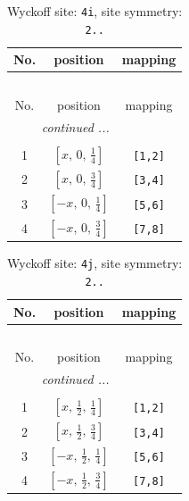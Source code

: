 \documentclass[fleqn,8pt]{jsarticle}
\begin{document}
\begin{longtable}{ccc}
\caption{Wyckoff site: {\tt 4i}, site symmetry: {\tt 2..}}
 \\
 \hline \hline
No. & position & mapping \\ \hline \endfirsthead

\multicolumn{2}{l}{\tablename\ \thetable{}} \\
 \hline \hline
No. & position & mapping \\ \hline \endhead

 \hline \hline
\multicolumn{2}{r}{\footnotesize\it continued ...} \\ \endfoot

 \hline \hline
\multicolumn{2}{r}{} \\ \endlastfoot

1 & $\left[ x,\, 0,\, \frac{1}{4} \right]$ & {\tt [1,2]} \\ \hline
2 & $\left[ x,\, 0,\, \frac{3}{4} \right]$ & {\tt [3,4]} \\ \hline
3 & $\left[ - x,\, 0,\, \frac{1}{4} \right]$ & {\tt [5,6]} \\ \hline
4 & $\left[ - x,\, 0,\, \frac{3}{4} \right]$ & {\tt [7,8]} \\
\end{longtable}
\renewcommand{\arraystretch}{1.2}
\begin{longtable}{ccc}
\caption{Wyckoff site: {\tt 4j}, site symmetry: {\tt 2..}}
 \\
 \hline \hline
No. & position & mapping \\ \hline \endfirsthead

\multicolumn{2}{l}{\tablename\ \thetable{}} \\
 \hline \hline
No. & position & mapping \\ \hline \endhead

 \hline \hline
\multicolumn{2}{r}{\footnotesize\it continued ...} \\ \endfoot

 \hline \hline
\multicolumn{2}{r}{} \\ \endlastfoot

1 & $\left[ x,\, \frac{1}{2},\, \frac{1}{4} \right]$ & {\tt [1,2]} \\ \hline
2 & $\left[ x,\, \frac{1}{2},\, \frac{3}{4} \right]$ & {\tt [3,4]} \\ \hline
3 & $\left[ - x,\, \frac{1}{2},\, \frac{1}{4} \right]$ & {\tt [5,6]} \\ \hline
4 & $\left[ - x,\, \frac{1}{2},\, \frac{3}{4} \right]$ & {\tt [7,8]} \\
\end{longtable}
\end{document}

